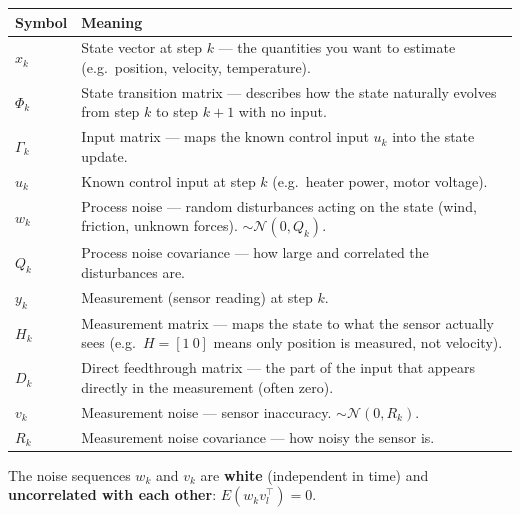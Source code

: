 \documentclass[12pt, a4paper]{article}
\begin{document}
\begin{center}
\renewcommand{\arraystretch}{1.4}
\begin{tabular}{p{1.5cm} p{12.5cm}}
  \toprule
  \textbf{Symbol} & \textbf{Meaning} \\
  \midrule
  $x_k$ & State vector at step $k$ --- the quantities you want to estimate
          (e.g.\ position, velocity, temperature). \\
  $\Phi_k$ & State transition matrix --- describes how the state naturally
             evolves from step $k$ to step $k{+}1$ with no input. \\
  $\Gamma_k$ & Input matrix --- maps the known control input $u_k$ into
               the state update. \\
  $u_k$ & Known control input at step $k$ (e.g.\ heater power, motor
          voltage). \\
  $w_k$ & Process noise --- random disturbances acting on the state
          (wind, friction, unknown forces). $\sim\mathcal{N}(0,Q_k)$. \\
  $Q_k$ & Process noise covariance --- how large and correlated the
          disturbances are. \\
  $y_k$ & Measurement (sensor reading) at step $k$. \\
  $H_k$ & Measurement matrix --- maps the state to what the sensor
          actually sees (e.g.\ $H=[1\ 0]$ means only position is
          measured, not velocity). \\
  $D_k$ & Direct feedthrough matrix --- the part of the input that
          appears directly in the measurement (often zero). \\
  $v_k$ & Measurement noise --- sensor inaccuracy. $\sim\mathcal{N}(0,R_k)$. \\
  $R_k$ & Measurement noise covariance --- how noisy the sensor is. \\
  \bottomrule
\end{tabular}
\end{center}

The noise sequences $w_k$ and $v_k$ are \textbf{white} (independent
in time) and \textbf{uncorrelated with each other}:
$E(w_k v_l^\top) = 0$.
\end{document}

